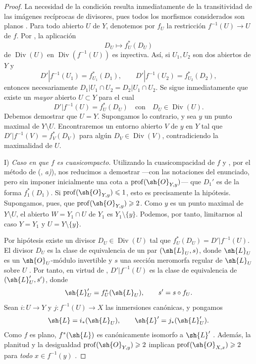 \begin{proof}
La necesidad de la condición resulta inmediatamente de la transitividad de las
imágenes recíprocas de divisores, pues todos los morfismos considerados son planos
{}. Para todo abierto $U$ de $Y$, denotemos por $f_U$ la
restricción $f^{-1}(U)\to U$ de $f$. Por {}, la aplicación
\[
 D_U\longmapsto f_U^*(D_U)
\]
de $\operatorname{Div}(U)$ en
$\operatorname{Div}(f^{-1}(U))$ es inyectiva. Así, si $U_1,U_2$ son
dos abiertos de $Y$ y
\[
 D'|f^{-1}(U_1)=f_{U_1}^*(D_1),\qquad
 D'|f^{-1}(U_2)=f_{U_2}^*(D_2),
\]
entonces necesariamente
$D_1|U_1\cap U_2=D_2|U_1\cap U_2$. Se sigue inmediatamente que existe un
\emph{mayor} abierto $U\subset Y$ para el cual
\[
 D'|f^{-1}(U)=f_U^*(D_U)
 \quad\text{con}\quad D_U\in\operatorname{Div}(U).
\]
Debemos demostrar que $U=Y$. Supongamos lo contrario, y sea $y$ un punto
maximal de $Y\setminus U$. Encontraremos un entorno abierto $V$ de
$y$ en $Y$ tal que
  $D'|f^{-1}(V)=f_V^*(D_V)$ para algún
$D_V\in\operatorname{Div}(V)$, contradiciendo la maximalidad de $U$.

\textup{I)} \emph{Caso en que $f$ es cuasicompacto.}
Utilizando la cuasicompacidad de $f$ y {}, por el método de
({}, \emph{a)}), nos reducimos a demostrar ---con las notaciones del
enunciado, pero sin imponer inicialmente una cota a
$\operatorname{prof}(\sh{O}_{Y,y})$--- que $D_1'$ es de la forma
$f_1^*(D_1)$. Si $\operatorname{prof}(\sh{O}_{Y,y})\leq 1$, esto es
precisamente la hipótesis. Supongamos, pues, que
$\operatorname{prof}(\sh{O}_{Y,y})\geq 2$. Como $y$ es un punto
maximal de $Y\setminus U$, el abierto $W=Y_1\cap U$ de $Y_1$ es
$Y_1\setminus\{y\}$. Podemos, por tanto, limitarnos al caso
$Y=Y_1$ y $U=Y\setminus\{y\}$.

Por hipótesis existe un divisor $D_U\in\operatorname{Div}(U)$ tal
que $f_U^*(D_U)=D'|f^{-1}(U)$. El divisor $D_U$ es la clase de
equivalencia de un par $(\sh{L}_U,s)$, donde $\sh{L}_U$ es un
$\sh{O}_U$-módulo invertible y $s$ una sección meromorfa regular de
$\sh{L}_U$ sobre $U$ {}. Por tanto, en virtud de
{}, $D'|f^{-1}(U)$ es la clase de equivalencia de
$(\sh{L}'_U,s')$, donde
\[
 \sh{L}'_U=f_U^*(\sh{L}_U),\qquad s'=s\circ f_U.
\]
Sean $i:U\to Y$ y $j:f^{-1}(U)\to X$ las inmersiones canónicas,
y pongamos
\[
 \sh{L}=i_*(\sh{L}_U),\qquad
 \sh{L}'=j_*(\sh{L}'_U).
\]
Como $f$ es plano, $f^*(\sh{L})$ es canónicamente isomorfo a
$\sh{L}'$ {}. Además, la planitud y la desigualdad
$\operatorname{prof}(\sh{O}_{Y,y})\geq 2$ implican
$\operatorname{prof}(\sh{O}_{X,x})\geq 2$ para \emph{todo}
$x\in f^{-1}(y)$ {}.


\end{proof}
